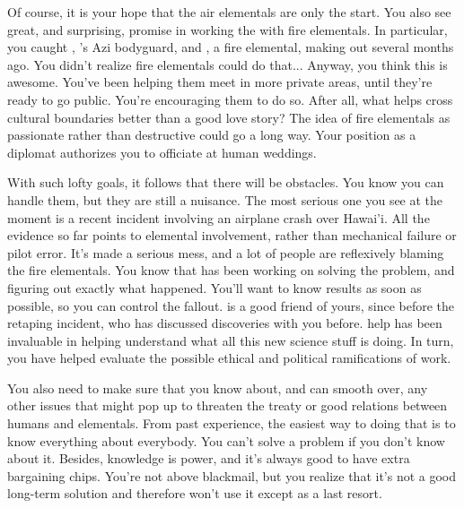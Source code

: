 \documentclass[char]{elementals}
\begin{document}
Of course, it is your hope that the air elementals are only the start.  You also see great, and surprising, promise in working the with fire elementals.  In particular, you caught \cRomeo{\intro}, \cLeader{}'s Azi bodyguard, and \cJuliet{\intro}, a fire elemental, making out several months ago.  You didn't realize fire elementals could do that...  Anyway, you think this is awesome.  You've been helping them meet in more private areas, until they're ready to go public.  You're encouraging them to do so.  After all, what helps cross cultural boundaries better than a good love story?  The idea of fire elementals as passionate rather than destructive could go a long way.  Your position as a diplomat authorizes you to officiate at human weddings.

With such lofty goals, it follows that there will be obstacles.  You know you can handle them, but they are still a nuisance.  The most serious one you see at the moment is a recent incident involving an airplane crash over Hawai'i.  All the evidence so far points to elemental involvement, rather than mechanical failure or pilot error.  It's made a serious mess, and a lot of people are reflexively blaming the fire elementals.  You know that \cScientist{\intro} has been working on solving the problem, and figuring out exactly what happened.  You'll want to know \cScientist{\their} results as soon as possible, so you can control the fallout.  \cScientist{} is a good friend of yours, since before the retaping incident, who has discussed \cScientist{\their} discoveries with you before.  \cScientist{\Their} help has been invaluable in helping understand what all this new science stuff is doing.  In turn, you have helped \cScientist{} evaluate the possible ethical and political ramifications of \cScientist{\their} work.


You also need to make sure that you know about, and can smooth over, any other issues that might pop up to threaten the treaty or good relations between humans and elementals.  From past experience, the easiest way to doing that is to know everything about everybody.  You can't solve a problem if you don't know about it.  Besides, knowledge is power, and it's always good to have extra bargaining chips.  You're not above blackmail, but you realize that it's not a good long-term solution and therefore won't use it except as a last resort.
\end{document}
